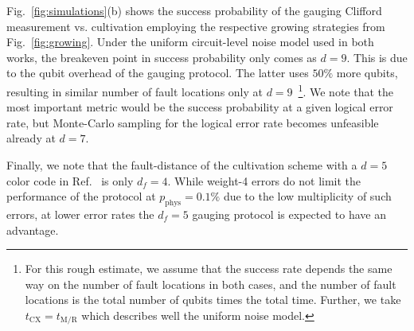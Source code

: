Fig.~\ref{fig:simulations}(b) shows the success probability of the gauging Clifford measurement vs. cultivation employing the respective growing strategies from Fig.~\ref{fig:growing}.
Under the uniform circuit-level noise model used in both works, the breakeven point in success probability only comes as $d=9$. This is due to the qubit overhead of the gauging protocol. The latter uses $50\%$ more qubits, resulting in similar number of fault locations only at $d=9$~\footnote{For this rough estimate, we assume that the success rate depends the same way on the number of fault locations in both cases, and the number of fault locations is the total number of qubits times the total time. Further, we take $t_\text{CX}=t_\text{M/R}$ which describes well the uniform noise model.}. 
We note that the most important metric would be the success probability at a given logical error rate, but Monte-Carlo sampling for the logical error rate becomes unfeasible already at $d=7$.

Finally, we note that the fault-distance of the cultivation scheme with a $d=5$ color code in Ref.~\cite{gidneyMagicStateCultivation2024} is only $d_f = 4$. While weight-4 errors do not limit the performance of the protocol at $p_\text{phys} = 0.1\%$ due to the low multiplicity of such errors, at lower error rates the $d_f = 5$ gauging protocol is expected to have an advantage.

\clearpage
